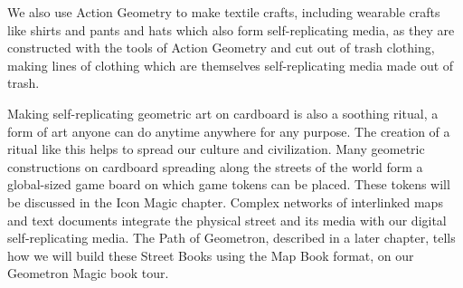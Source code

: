 We also use Action Geometry to make textile crafts, including wearable
crafts like shirts and pants and hats which also form self-replicating
media, as they are constructed with the tools of Action Geometry and cut
out of trash clothing, making lines of clothing which are themselves
self-replicating media made out of trash.

Making self-replicating geometric art on cardboard is also a soothing
ritual, a form of art anyone can do anytime anywhere for any purpose.
The creation of a ritual like this helps to spread our culture and
civilization. Many geometric constructions on cardboard spreading along
the streets of the world form a global-sized game board on which game
tokens can be placed. These tokens will be discussed in the Icon Magic
chapter. Complex networks of interlinked maps and text documents
integrate the physical street and its media with our digital
self-replicating media. The Path of Geometron, described in a later
chapter, tells how we will build these Street Books using the Map Book
format, on our Geometron Magic book tour.
